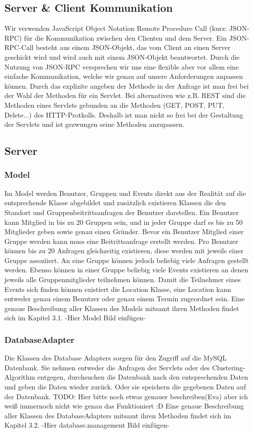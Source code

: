 	\subsection{Server \& Client Kommunikation}
	Wir verwenden JavaScript Object Notation Remote Procedure Call (kurz: JSON-RPC) für die Kommunikation zwischen den Clienten und dem Server.
	Ein JSON-RPC-Call besteht aus einem JSON-Objekt, das vom Client an einen Server geschickt wird und wird auch mit einem JSON-Objekt beantwortet.
	Durch die Nutzung von JSON-RPC versprechen wir uns eine flexible aber vor allem eine einfache Kommunikation, welche wir genau auf unsere 		Anforderungen anpassen können.
Durch das explizite angeben der Methode in der Anfrage ist man frei bei der Wahl der Methoden für ein Servlet. Bei alternativen wie z.B. REST sind die Methoden eines Servlets gebunden an die Methoden (GET, POST, PUT, Delete...) des HTTP-Protkolls. Deshalb ist man nicht so frei bei der Gestaltung der Servlets und ist gezwungen seine Methoden anzupassen.
	
	\subsection{Server}
	\subsubsection{Model}
Im Model werden Benutzer, Gruppen und Events direkt aus der Realität auf die entsprechende Klasse abgebildet und zusätzlich existieren Klassen die den Standort und Gruppenbeitrittsanfragen der Benutzer darstellen.
Ein Benutzer kann Mitglied in bis zu 20 Gruppen sein, und in jeder Gruppe darf es bis zu 50 Mitglieder geben sowie genau einen Gründer. Bevor ein Benutzer Mitglied einer Gruppe werden kann muss eine Beitrittsanfrage erstellt werden.
Pro Benutzer können bis zu 20 Anfragen gleichzeitig existieren, diese werden mit jeweils einer Gruppe assoziiert.
An eine Gruppe können jedoch beliebig viele Anfragen gestellt werden.
Ebenso können in einer Gruppe beliebig viele Events existieren an denen jeweils alle Gruppenmitglieder teilnehmen können.
Damit die Teilnehmer eines Events sich finden können existiert die Location Klasse, eine Location kann entweder genau einem Benutzer oder genau einem Termin zugeordnet sein. 
Eine genaue Beschreibung aller Klassen des Models mitsamt ihren Methoden findet sich im Kapitel 3.1.
-Hier Model Bild einfügen-

	\subsubsection{DatabaseAdapter}
	Die Klassen des Database Adapters sorgen für den Zugriff auf die MySQL Datenbank.
Sie nehmen entweder die Anfragen der Servlets oder des Clustering-Algorithm entgegen, durchsuchen die Datenbank nach den entsprechenden Daten und geben die Daten wieder zurück.  
Oder sie speichern die gegebenen Daten auf der Datenbank.
TODO: Hier bitte noch etwas genauer beschreiben(Eva) aber ich weiß immernoch nicht wie genau das Funktioniert :D
Eine genaue Beschreibung aller Klassen des DatabaseAdapters mitsamt ihren Methoden findet sich im Kapitel 3.2.
-Hier database.management Bild einfügen-

